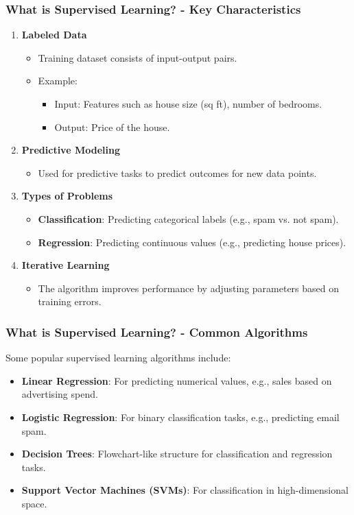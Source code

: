\documentclass{beamer}
\begin{document}
\begin{frame}[fragile]
    \frametitle{What is Supervised Learning? - Key Characteristics}
    \begin{enumerate}
        \item \textbf{Labeled Data}
        \begin{itemize}
            \item Training dataset consists of input-output pairs.
            \item Example:
            \begin{itemize}
                \item Input: Features such as house size (sq ft), number of bedrooms.
                \item Output: Price of the house.
            \end{itemize}
        \end{itemize}

        \item \textbf{Predictive Modeling}
        \begin{itemize}
            \item Used for predictive tasks to predict outcomes for new data points.
        \end{itemize}

        \item \textbf{Types of Problems}
        \begin{itemize}
            \item \textbf{Classification}: Predicting categorical labels (e.g., spam vs. not spam).
            \item \textbf{Regression}: Predicting continuous values (e.g., predicting house prices).
        \end{itemize}

        \item \textbf{Iterative Learning}
        \begin{itemize}
            \item The algorithm improves performance by adjusting parameters based on training errors.
        \end{itemize}
    \end{enumerate}
\end{frame}

\begin{frame}[fragile]
    \frametitle{What is Supervised Learning? - Common Algorithms}
    Some popular supervised learning algorithms include:
    \begin{itemize}
        \item \textbf{Linear Regression}: For predicting numerical values, e.g., sales based on advertising spend.
        \item \textbf{Logistic Regression}: For binary classification tasks, e.g., predicting email spam.
        \item \textbf{Decision Trees}: Flowchart-like structure for classification and regression tasks.
        \item \textbf{Support Vector Machines (SVMs)}: For classification in high-dimensional space.
    \end{itemize}
\end{frame}
\end{document}
